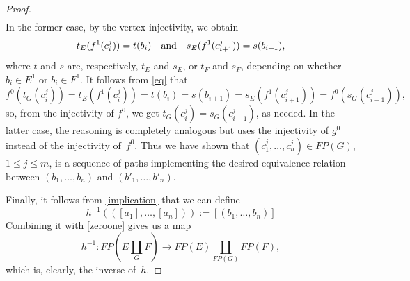 \documentclass[10pt,a4paper]{amsart}
\def\text{\hbox}
\begin{document}
\begin{proof}
\begin{gather}
\end{gather}
 In the former case, by the vertex injectivity, we obtain
\begin{equation}\label{eq}
t_E(f^1(c^j_i))=t(b_i)\quad\text{and}\quad s_E(f^1(c^j_{i+1}))=s(b_{i+1}),
\end{equation}
where $t$ and $s$ are, respectively, $t_E$ and $s_E$, or $t_F$ and $s_F$, depending on whether
$b_i\in E^1$ or $b_i\in F^1$. It follows from \eqref{eq} that
\begin{equation}
f^0(t_G(c^j_i))=t_E(f^1(c^j_i))=t(b_i)=s(b_{i+1})=s_E(f^1(c^j_{i+1}))=f^0(s_G(c^j_{i+1})),
\end{equation}
so, from the injectivity of $f^0$, we get $t_G(c^j_i)=s_G(c^j_{i+1})$, as needed. In the latter case,
the reasoning is completely analogous but uses the injectivity of $g^0$ instead of the injectivity of~$f^0$.
Thus we have shown that $(c^j_1,\ldots,c^j_n)\in FP(G)$, $1\leq j\leq m$, is a sequence of paths
 implementing the desired equivalence relation between $(b_1,\ldots,b_n)$ and $(b'_1,\ldots,b'_n)$.

Finally, it follows from \eqref{implication} that we can define 
\begin{equation}
h^{-1}(([a_1],\ldots,[a_n])):=[(b_1,\ldots,b_n)]
\end{equation} 
Combining it with \eqref{zeroone} gives us
a map 
\begin{equation}
h^{-1}:FP\left(E\underset{G}{\amalg}F\right)\longrightarrow FP(E)\underset{FP(G)}{\amalg}FP(F),
\end{equation} 
which is, clearly, the inverse of~$h$. 
\end{proof}
\end{document}

